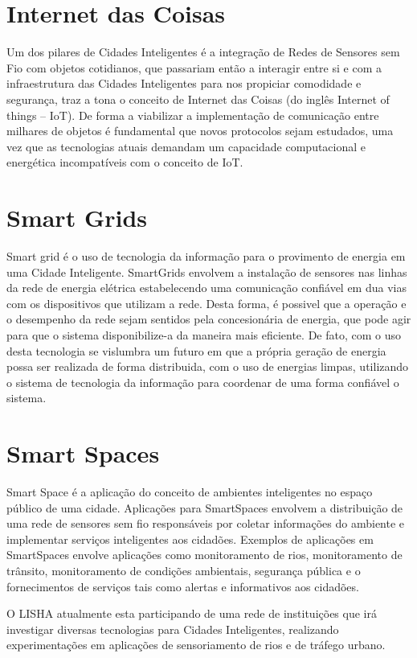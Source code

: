 \documentclass{acm_proc_article-sp}
\newcommand{\fig}[4][htb]{
  \begin{figure}[#1]
    {\centering{\texttt{[image: fig/\#2]}}\par}
    \label{fig:#2}
  \end{figure}
}
\begin{document}
\section*{Internet das Coisas} 

Um dos pilares de Cidades Inteligentes é a integração de Redes de Sensores sem
Fio com objetos cotidianos, que passariam então a interagir entre si e com a
infraestrutura das Cidades Inteligentes para nos propiciar comodidade e
segurança, traz a tona o conceito de Internet das Coisas (do inglês Internet
of things – IoT). De forma a viabilizar a implementação de comunicação entre
milhares de objetos é fundamental que novos protocolos sejam estudados, uma
vez que as tecnologias atuais demandam um capacidade computacional e
energética incompatíveis com o conceito de IoT.

\fig{iot}{}{width=\columnwidth}

\section*{Smart Grids}

Smart grid é o uso de tecnologia da informação para o provimento de energia em
uma Cidade Inteligente. SmartGrids envolvem a instalação de sensores nas
linhas da rede de energia elétrica estabelecendo uma comunicação confiável em
dua vias com os dispositivos que utilizam a rede. Desta forma, é possivel que
a operação e o desempenho da rede sejam sentidos pela concesionária de
energia, que pode agir para que o sistema disponibilize-a da maneira mais
eficiente. De fato, com o uso desta tecnologia se vislumbra um futuro em que a
própria geração de energia possa ser realizada de forma distribuida, com o uso
de energias limpas, utilizando o sistema de tecnologia da informação para
coordenar de uma forma confiável o sistema.

\section*{Smart Spaces}

Smart Space é a aplicação do conceito de ambientes inteligentes no espaço
público de uma cidade. Aplicações para SmartSpaces envolvem a distribuição de
uma rede de sensores sem fio responsáveis por coletar informações do ambiente
e implementar serviços inteligentes aos cidadões. Exemplos de aplicações em
SmartSpaces envolve aplicações como monitoramento de rios, monitoramento de
trânsito, monitoramento de condições ambientais, segurança pública e o
fornecimentos de serviços tais como alertas e informativos aos cidadões.

O LISHA atualmente esta participando de uma rede de instituições que irá investigar diversas tecnologias para Cidades Inteligentes, realizando experimentações em aplicações de sensoriamento de rios e de tráfego urbano.
\end{document}
